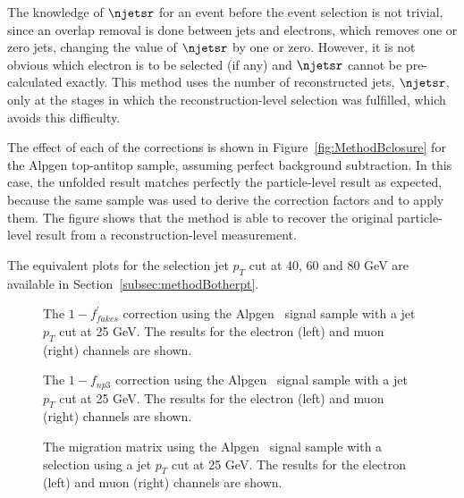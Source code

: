The knowledge
of $\njetsr$ for an event before the event selection is not trivial, since
an overlap removal is done between jets and electrons, which removes
one or zero jets, changing the value of $\njetsr$ by one or zero. However,
it is not obvious which electron is to be selected (if any) and $\njetsr$
cannot be pre-calculated exactly.
This method uses the number of reconstructed jets, $\njetsr$,
only at the stages
in which the reconstruction-level selection was fulfilled, which avoids this
difficulty.

The effect of each of the corrections is shown in
Figure~\ref{fig:MethodBclosure} for the Alpgen top-antitop sample,
assuming perfect background subtraction. In this case, the unfolded result
matches perfectly the particle-level result as expected, because the same sample was used to derive the correction factors
and to apply them. The figure shows that the method is able to
recover the original particle-level result from a reconstruction-level
measurement.

The equivalent plots for the selection jet $p_T$ cut at 40, 60 and 80 GeV
are available in Section~\ref{subsec:methodBotherpt}.


\begin{figure}[htbp]
\centering
{}
\caption{The $1 - f^{\prime}_{fakes}$ correction using the Alpgen \ttbar\ signal sample with a jet $p_T$ cut at 25 GeV.  The results for the electron (left) and muon (right) channels are shown.}
\label{fig:MethodBffakesp}
\end{figure}


\begin{figure}[htbp]
\centering
{}
\caption{The $1 - f_{np3}$ correction using the Alpgen  \ttbar\ signal sample with a jet $p_T$ cut at 25 GeV.  The results for the electron (left) and muon (right) channels are shown.}
\label{fig:MethodBfnp3}
\end{figure}


\begin{figure}[htbp]
\centering
{}
\caption{The migration matrix using the Alpgen  \ttbar\ signal sample with a selection using a jet $p_T$ cut at 25 GeV.  The results for the electron (left) and muon (right) channels are shown.}
\label{fig:MethodBmigration}
\end{figure}

